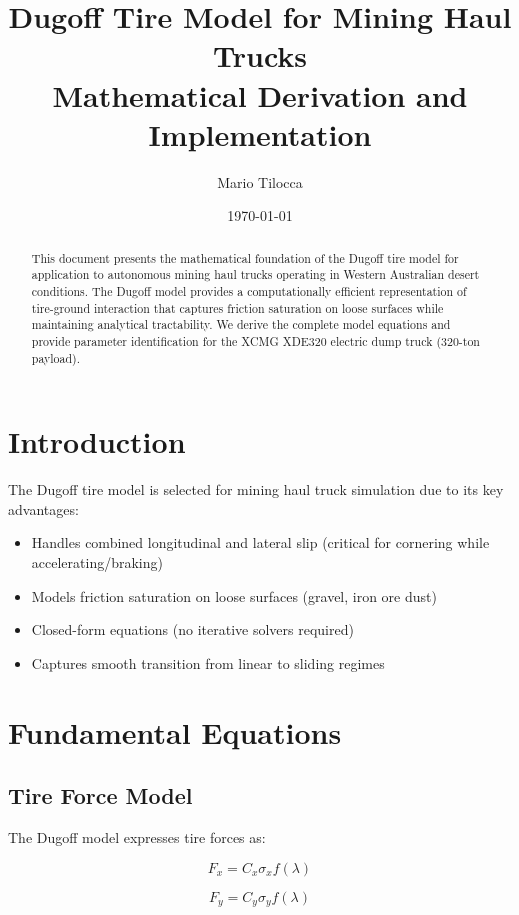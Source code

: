 \documentclass[11pt,a4paper]{article}
\title{Dugoff Tire Model for Mining Haul Trucks\\
\large Mathematical Derivation and Implementation}
\author{Mario Tilocca}
\date{\today}
\begin{document}
\maketitle

\begin{abstract}
This document presents the mathematical foundation of the Dugoff tire model for application to autonomous mining haul trucks operating in Western Australian desert conditions. The Dugoff model provides a computationally efficient representation of tire-ground interaction that captures friction saturation on loose surfaces while maintaining analytical tractability. We derive the complete model equations and provide parameter identification for the XCMG XDE320 electric dump truck (320-ton payload).
\end{abstract}

\section{Introduction}

The Dugoff tire model \cite{dugoff1970} is selected for mining haul truck simulation due to its key advantages:
\begin{itemize}
    \item Handles combined longitudinal and lateral slip (critical for cornering while accelerating/braking)
    \item Models friction saturation on loose surfaces (gravel, iron ore dust)
    \item Closed-form equations (no iterative solvers required)
    \item Captures smooth transition from linear to sliding regimes
\end{itemize}

\section{Fundamental Equations}

\subsection{Tire Force Model}

The Dugoff model expresses tire forces as:

\begin{equation}
F_x = C_x \sigma_x f(\lambda)
\end{equation}

\begin{equation}
F_y = C_y \sigma_y f(\lambda)
\end{equation}
\end{document}

